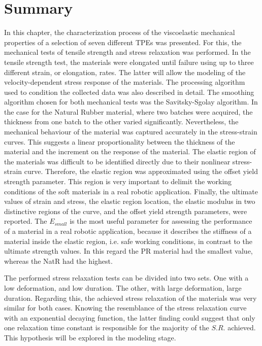 
\section{Summary}

In this chapter, the characterization process of the viscoelastic mechanical properties of a selection of seven different TPEs was presented. For this, the mechanical tests of tensile strength and stress relaxation was performed. In the tensile strength test, the materials were elongated until failure using up to three different strain, or elongation, rates. The latter will allow the modeling of the velocity-dependent stress response of the materials. The processing algorithm used to condition the collected data was also described in detail. The smoothing algorithm chosen for both mechanical tests was the Savitsky-Sgolay algorithm. In the case for the Natural Rubber material, where two batches were acquired, the thickness from one batch to the other varied significantly. Nevertheless, the mechanical behaviour of the material was captured accurately in the stress-strain curves. This suggests a linear proportionality between the thickness of the material and the increment on the response of the material. The elastic region of the materials was difficult to be identified directly due to their nonlinear stress-strain curve. Therefore, the elastic region was approximated using the offset yield strength parameter. This region is very important to delimit the working conditions of the soft materials in a real robotic application. Finally, the ultimate values of strain and stress, the elastic region location, the elastic modulus in two distinctive regions of the curve, and the offset yield strength parameters, were reported. The $E_{small}$ is the most useful parameter for assessing the performance of a material in a real robotic application, because it describes the stiffness of a material inside the elastic region, i.e. safe working conditions, in contrast to the ultimate strength values. In this regard the PR material had the smallest value, whereas the NatR had the highest.

The performed stress relaxation tests can be divided into two sets. One with a low deformation, and low duration. The other, with large deformation, large duration. Regarding this, the achieved stress relaxation of the materials was very similar for both cases. Knowing the resemblance of the stress relaxation curve with an exponential decaying function, the latter finding could suggest that only one relaxation time constant is responsible for the majority of the $S.R.$ achieved.  This hypothesis will be explored in the modeling stage. 

